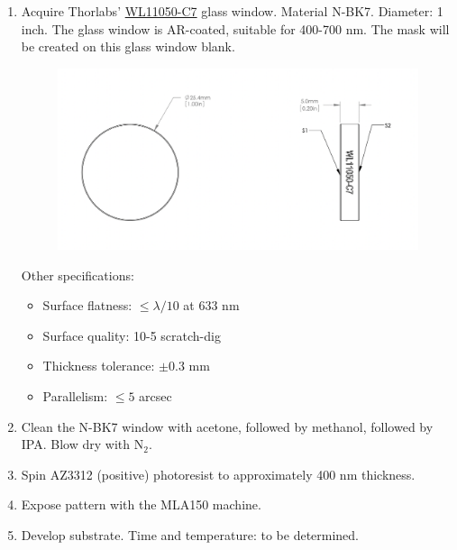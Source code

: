 \documentclass{article}
\theoremstyle{definition}
\begin{document}
\begin{enumerate}[label=(\alph*)]

\item Acquire Thorlabs' \href{https://www.thorlabs.com/thorproduct.cfm?partnumber=WL11050-C7}{WL11050-C7} glass window. Material N-BK7. Diameter: 1 inch. The glass window is AR-coated, suitable for 400-700 nm. The mask will be created on this glass window blank. 



\begin{figure}[!htb]
\centering
\includegraphics[scale=0.6]{thorlabs_window.png}
\end{figure}

Other specifications:
\begin{itemize}
\item Surface flatness: $\leq \lambda/10$ at 633 nm

\item Surface quality: 10-5 scratch-dig

\item Thickness tolerance: $\pm 0.3$ mm 

\item Parallelism: $\leq 5$ arcsec
\end{itemize}


\item Clean the N-BK7 window with acetone, followed by methanol, followed by IPA. Blow dry with N$_2$.

\item Spin AZ3312 (positive) photoresist to approximately 400 nm thickness.

\item Expose pattern with the MLA150 machine.

\item Develop substrate. Time and temperature: to be determined.


\end{enumerate}
\end{document}
